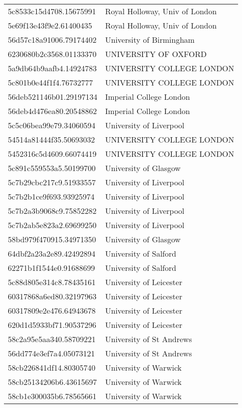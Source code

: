 \begin{tabular}{ll}
5c8533c15d4708.15675991 & Royal Holloway, Univ of London \\
5e69f13e43f9e2.61400435 & Royal Holloway, Univ of London \\
56d57c18a91006.79174402 & University of Birmingham \\
6230680b2c3568.01133370 & UNIVERSITY OF OXFORD \\
5a9db64b9aafb4.14924783 & UNIVERSITY COLLEGE LONDON \\
5c801b0e44f1f4.76732777 & UNIVERSITY COLLEGE LONDON \\
56deb521146b01.29197134 & Imperial College London \\
56deb4d476ea80.20548862 & Imperial College London \\
5c5c06bea99e79.34060594 & University of Liverpool \\
54514a81444f35.50693032 & UNIVERSITY COLLEGE LONDON \\
5452316c5d4609.66074419 & UNIVERSITY COLLEGE LONDON \\
5c891c559553a5.50199700 & University of Glasgow \\
5c7b29cbc217c9.51933557 & University of Liverpool \\
5c7b2b1ce9f693.93925974 & University of Liverpool \\
5c7b2a3b9068c9.75852282 & University of Liverpool \\
5c7b2ab5e823a2.69699250 & University of Liverpool \\
58bd979f470915.34971350 & University of Glasgow \\
64dbf2a23a2e89.42492894 & University of Salford \\
62271b1f1544e0.91688699 & University of Salford \\
5c88d805e314c8.78435161 & University of Leicester \\
60317868a6ed80.32197963 & University of Leicester \\
60317809e2e476.64943678 & University of Leicester \\
620d1d5933bf71.90537296 & University of Leicester \\
58c2a95e5aa340.58709221 & University of St Andrews \\
56dd774e3ef7a4.05073121 & University of St Andrews \\
58cb226841df14.80305740 & University of Warwick \\
58cb25134206b6.43615697 & University of Warwick \\
58cb1e300035b6.78565661 & University of Warwick \\

\end{tabular}
